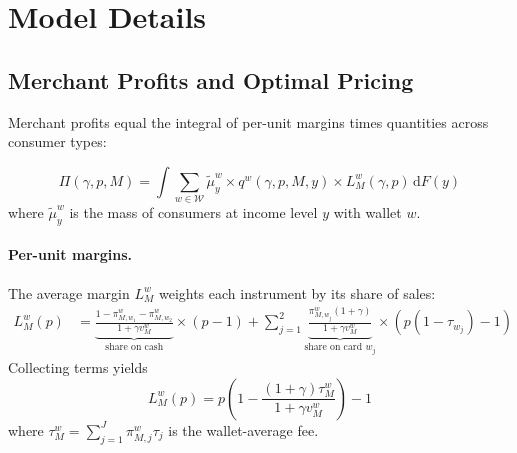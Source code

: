 \documentclass[main.tex]{subfiles}
\begin{document}

\section{Model Details}

\label{sec:appendix-model}

\subsection{Merchant Profits and Optimal Pricing}
\label{subsec:appendix-merch-profits}
\label{subsec:appendix-merch-pricing}

Merchant profits equal the integral of per-unit margins times quantities across consumer types:

\begin{equation}
\Pi\left(\gamma,p,M\right)=\int\sum_{w\in\mathcal{W}}\tilde{\mu}_{y}^{w}\times q^{w}\left(\gamma,p,M,y\right)\times L_{M}^{w}\left(\gamma,p\right)\,\mathrm{d}F\left(y\right)
\end{equation}
where $\tilde{\mu}_y^w$ is the mass of consumers at income level $y$ with wallet $w$.

\paragraph{Per-unit margins.} The average margin $L_M^w$ weights each instrument by its share of sales:
\begin{align}
L_{M}^{w}\left(p\right)
&= \underbrace{\frac{1-\pi_{M,w_{1}}^{w}-\pi_{M,w_{2}}^{w}}{1+\gamma v_{M}^{w}}}_{\text{share on cash}}\times\left(p-1\right)+\sum_{j=1}^{2}\underbrace{\frac{\pi_{M,w_{j}}^{w}\left(1+\gamma\right)}{1+\gamma v_{M}^{w}}}_{\text{share on card }w_{j}}\times\left(p\left(1-\tau_{w_{j}}\right)-1\right)
\end{align}
Collecting terms yields
\begin{equation}
L_{M}^{w}\left(p\right) = p\left(1-\frac{(1+\gamma)\tau_{M}^{w}}{1+\gamma v_{M}^{w}}\right)-1
\end{equation}
where $\tau_M^w = \sum_{j=1}^{J}\pi^w_{M,j}\tau_j$ is the wallet-average fee.
\end{document}
